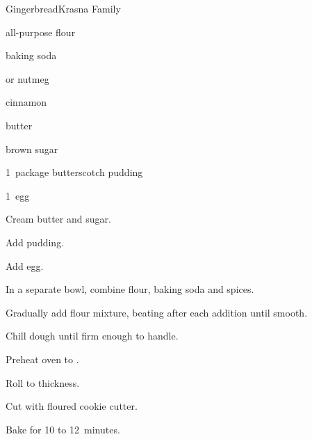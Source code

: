 \begin{recipe}{Gingerbread}{Krasna Family}{}

\begin{ingredients}
\item \C{1\half} all-purpose flour
\item {} baking soda
\item {}  or nutmeg
\item \tp{1\half} cinnamon
\item \C{\half} butter
\item \C{\half} brown sugar
\item 1~package butterscotch pudding
\item 1~egg
\end{ingredients}

\begin{directions}
\item Cream butter and sugar.
\item Add pudding.
\item Add egg.
\item In a separate bowl, combine flour, baking soda and spices.
\item Gradually add flour mixture, beating after each addition until smooth.
\item Chill dough until firm enough to handle.
\item Preheat oven to .
\item Roll to  thickness.
\item Cut with floured cookie cutter.
\item Bake for 10 to 12~minutes.
\end{directions}
\end{recipe}
